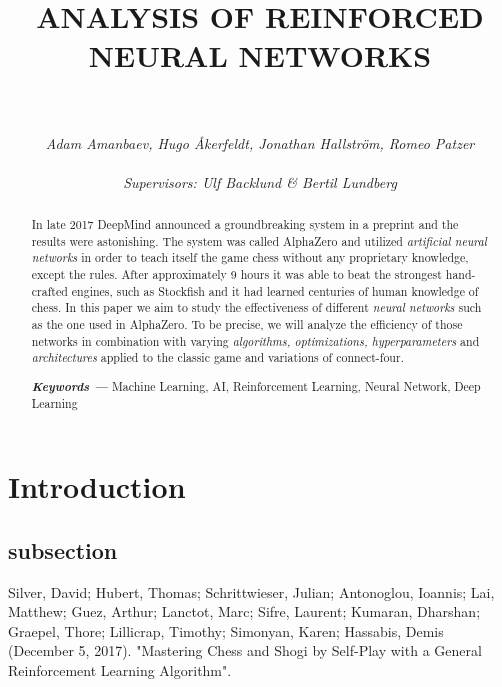 \documentclass[titlepage]{article}
\title{\textbf{ANALYSIS OF REINFORCED \\NEURAL NETWORKS}}
\author{\rule{8cm}{0.5mm} \\[0.5in] \textit{Adam Amanbaev, Hugo Åkerfeldt, Jonathan Hallström, Romeo Patzer} \\\\
    \small \textit{Supervisors: Ulf Backlund \& Bertil Lundberg}
}
\date{}
\providecommand{\keywords}[1] { 
    \small
    \textbf{\textit{Keywords ---}} #1
}
\begin{document}
\maketitle

\newpage

\begin{abstract}
    In late 2017 DeepMind announced a groundbreaking system in a preprint \cite{alphazero} and the results were astonishing. The system was called AlphaZero and utilized \emph{artificial neural networks} in order to teach itself the game chess without any proprietary knowledge, except the rules. After approximately 9 hours it was able to beat the strongest hand-crafted engines, such as Stockfish and it had learned centuries of human knowledge of chess. In this paper we aim to study the effectiveness of different \emph{neural networks} such as the one used in AlphaZero. To be precise, we will analyze the efficiency of those networks in combination with varying \emph{algorithms, optimizations, hyperparameters} and \emph {architectures} applied to the classic game and variations of connect-four. \\[0.5in]
\centerline{\keywords{Machine Learning, AI, Reinforcement Learning, Neural Network, Deep Learning}} 
\end{abstract}

\tableofcontents

\newpage

\section{Introduction}

\subsection{subsection}


\begin{thebibliography}{100}
Silver, David; Hubert, Thomas; Schrittwieser, Julian; Antonoglou, Ioannis; Lai, Matthew; Guez, Arthur; Lanctot, Marc; Sifre, Laurent; Kumaran, Dharshan; Graepel, Thore; Lillicrap, Timothy; Simonyan, Karen; Hassabis, Demis (December 5, 2017). "Mastering Chess and Shogi by Self-Play with a General Reinforcement Learning Algorithm".

\end{thebibliography}
\end{document}

